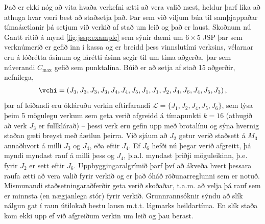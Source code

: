 \documentclass[]{article}
\begin{document}
Það er ekki nóg að vita hvaða verkefni ætti að vera valið næst, 
heldur þarf líka að athuga hvar væri best að staðsetja það. 
Þar sem við viljum búa til samþjappaðar tímaáætlanir  þá setjum við verkið af 
stað um leið og það er laust. 
Skoðnum nú Gantt ritið á mynd \ref{fig:jssp:example} sem sýnir dæmi um 
$6\times5$ JSP þar sem verknúmerið er gefið inn í kassa og er breidd þess 
vinnslutími verksins, 
vélarnar eru á lóðrétta ásinum og lárétti ásinn segir til um tíma aðgerða,
þar sem núverandi $C_{\max}$ gefið sem punktalína. 
Búið er að setja af stað 15 aðgerðir, nefnilega, 
\begin{eqnarray}
\vchi=\left(J_3,J_3,J_3,J_3,J_4,J_4,J_5,J_1,J_1,J_2,J_4,J_6,J_4,J_5,J_3\right),
\end{eqnarray}
þar af leiðandi eru ókláruðu verkin eftirfarandi 
$\mathcal{L}=\{J_1,J_2,J_4,J_5,J_6\}$, sem lýsa þeim 5 mögulegu verkum sem geta 
verið afgreidd á tímapunkti $k=16$ (athugið að verk $J_3$ er fullklárað) -- 
þessi verk eru gefin upp með brotalínu og sýna hvernig staðan gæti breyst með 
áætlun þeirra. 
Við sjáum að $J_2$ getur verið staðsett á $M_3$ annaðhvort á milli  $J_3$ og 
$J_4$, eða eftir $J_4$.  Ef $J_6$ hefði nú þegar verið afgreitt, þá myndi 
myndast rauf á milli þess og $J_4$, þ.a.l. myndast þriðji möguleikinn, þ.e. 
fyrir $J_2$ er sett eftir $J_6$. 
Uppbyggingaralgrímið þarf því að ákveða hvert þessara raufa ætti að vera 
valið fyrir verkið og er það óháð röðunarreglunni sem er notuð. 
Mismunandi staðsetningaraðferðir geta verið skoðaðar, t.a.m. að velja þá rauf 
sem er minnsta (en nægjanlega stór) fyrir verkið. Grunnrannsóknir sýndu að 
slík nálgun gat í raun útilokað bestu lausn m.t.t. lágmarks heildartíma. 
En slík staða kom ekki upp ef við afgreiðum verkin um leið og þau berast. 
\end{document}
